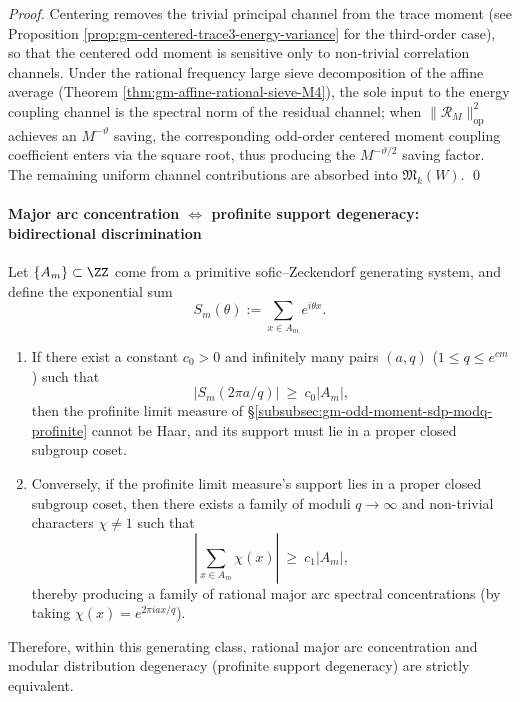 \begin{proof}
Centering removes the trivial principal channel from the trace moment (see Proposition \ref{prop:gm-centered-trace3-energy-variance} for the third-order case), so that the centered odd moment is sensitive only to non-trivial correlation channels.
Under the rational frequency large sieve decomposition of the affine average (Theorem \ref{thm:gm-affine-rational-sieve-M4}), the sole input to the energy coupling channel is the spectral norm of the residual channel; when \(\|\mathcal{R}_M\|_{\mathrm{op}}^2\) achieves an \(M^{-\vartheta}\) saving, the corresponding odd-order centered moment coupling coefficient enters via the square root, thus producing the \(M^{-\vartheta/2}\) saving factor.
The remaining uniform channel contributions are absorbed into \(\mathfrak{M}_k(W)\). \qed
\end{proof}

\paragraph{Major arc concentration \texorpdfstring{$\Longleftrightarrow$}{<->} profinite support degeneracy: bidirectional discrimination}
\begin{theorem}\label{thm:gm-major-arc-profinite-equivalence}
Let \(\{A_m\}\subset\ZZ\) come from a primitive sofic--Zeckendorf generating system, and define the exponential sum
\[
S_m(\theta):=\sum_{x\in A_m}e^{i\theta x}.
\]
\begin{enumerate}
  \item If there exist a constant \(c_0>0\) and infinitely many pairs \((a,q)\) (\(1\le q\le e^{cm}\)) such that
  \[
  |S_m(2\pi a/q)|\ \ge\ c_0|A_m|,
  \]
  then the profinite limit measure of \S\ref{subsubsec:gm-odd-moment-sdp-modq-profinite} cannot be Haar, and its support must lie in a proper closed subgroup coset.
  \item Conversely, if the profinite limit measure's support lies in a proper closed subgroup coset, then there exists a family of moduli \(q\to\infty\) and non-trivial characters \(\chi\neq 1\) such that
  \[
  \left|\sum_{x\in A_m}\chi(x)\right|\ \ge\ c_1|A_m|,
  \]
  thereby producing a family of rational major arc spectral concentrations (by taking \(\chi(x)=e^{2\pi i a x/q}\)).
\end{enumerate}
Therefore, within this generating class, rational major arc concentration and modular distribution degeneracy (profinite support degeneracy) are strictly equivalent.
\end{theorem}

